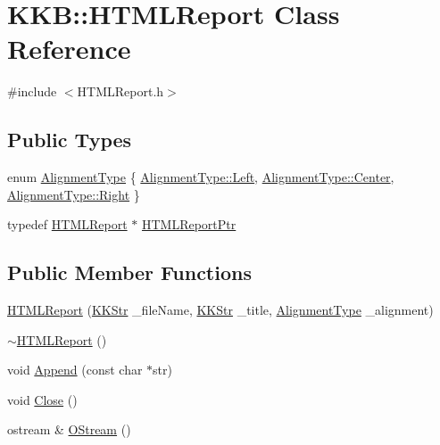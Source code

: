 \hypertarget{class_k_k_b_1_1_h_t_m_l_report}{}\section{K\+KB\+:\+:H\+T\+M\+L\+Report Class Reference}
\label{class_k_k_b_1_1_h_t_m_l_report}


{\ttfamily \#include $<$H\+T\+M\+L\+Report.\+h$>$}

\subsection*{Public Types}
\begin{DoxyCompactItemize}
\item 
enum \hyperlink{class_k_k_b_1_1_h_t_m_l_report_a8b81cb6f8bcc1a7aca049452b3575530}{Alignment\+Type} \{ \hyperlink{class_k_k_b_1_1_h_t_m_l_report_a8b81cb6f8bcc1a7aca049452b3575530a945d5e233cf7d6240f6b783b36a374ff}{Alignment\+Type\+::\+Left}, 
\hyperlink{class_k_k_b_1_1_h_t_m_l_report_a8b81cb6f8bcc1a7aca049452b3575530a4f1f6016fc9f3f2353c0cc7c67b292bd}{Alignment\+Type\+::\+Center}, 
\hyperlink{class_k_k_b_1_1_h_t_m_l_report_a8b81cb6f8bcc1a7aca049452b3575530a92b09c7c48c520c3c55e497875da437c}{Alignment\+Type\+::\+Right}
 \}
\item 
typedef \hyperlink{class_k_k_b_1_1_h_t_m_l_report}{H\+T\+M\+L\+Report} $\ast$ \hyperlink{class_k_k_b_1_1_h_t_m_l_report_a8b68e502b29c1e631f43ba1514bb4c67}{H\+T\+M\+L\+Report\+Ptr}
\end{DoxyCompactItemize}
\subsection*{Public Member Functions}
\begin{DoxyCompactItemize}
\item 
\hyperlink{class_k_k_b_1_1_h_t_m_l_report_ab19e5bec82649e7d8810b409e41e628a}{H\+T\+M\+L\+Report} (\hyperlink{class_k_k_b_1_1_k_k_str}{K\+K\+Str} \+\_\+file\+Name, \hyperlink{class_k_k_b_1_1_k_k_str}{K\+K\+Str} \+\_\+title, \hyperlink{class_k_k_b_1_1_h_t_m_l_report_a8b81cb6f8bcc1a7aca049452b3575530}{Alignment\+Type} \+\_\+alignment)
\item 
\hyperlink{class_k_k_b_1_1_h_t_m_l_report_ae433de08ed17a999c333c0db7b53794e}{$\sim$\+H\+T\+M\+L\+Report} ()
\item 
void \hyperlink{class_k_k_b_1_1_h_t_m_l_report_a09082cb2237dd2ba4f2ac6e7bda0fb14}{Append} (const char $\ast$str)
\item 
void \hyperlink{class_k_k_b_1_1_h_t_m_l_report_a3a4b97e50426105dcb7ea1f1f4e4bccf}{Close} ()
\item 
ostream \& \hyperlink{class_k_k_b_1_1_h_t_m_l_report_a582d937e7de26d109cf34d8db5004ea2}{O\+Stream} ()
\end{DoxyCompactItemize}
